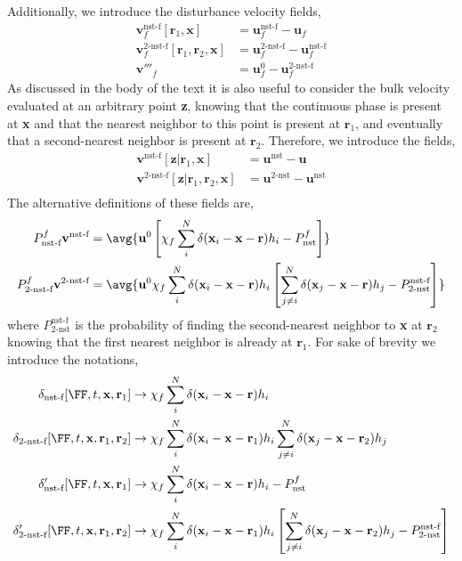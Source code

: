 Additionally, we introduce the disturbance velocity fields, 
\begin{align}
    \textbf{v}^\text{nst-f}_f[\textbf{r}_1,\textbf{x}] &= \textbf{u}^\text{nst-f}_f - \textbf{u}_f\\
    \textbf{v}^\text{2-nst-f}_f[\textbf{r}_1,\textbf{r}_2,\textbf{x}] &= \textbf{u}^\text{2-nst-f}_f - \textbf{u}_f^\text{nst-f}\\
    \textbf{v}'''_f &= \textbf{u}^0_f - \textbf{u}^\text{2-nst-f}_f
\end{align}
As discussed in the body of the text it is also useful to consider the bulk velocity evaluated at an arbitrary point \textbf{z}, knowing that the continuous phase is present at \textbf{x} and that the nearest neighbor to this point is present at $\textbf{r}_1$, and eventually that a second-nearest neighbor is present at $\textbf{r}_2$. 
Therefore, we introduce the fields, 
\begin{align}
    \textbf{v}^\text{nst-f}[\textbf{z}| \textbf{r}_1,\textbf{x}] &= \textbf{u}^\text{nst} - \textbf{u}\\
    \textbf{v}^\text{2-nst-f}[\textbf{z}| \textbf{r}_1,\textbf{r}_2,\textbf{x}] &= \textbf{u}^\text{2-nst} - \textbf{u}^\text{nst}\\
\end{align}
The alternative definitions of these fields are, 
\begin{align}
    P_\text{nst-f}^f \textbf{v}^\text{nst-f} &= \avg{ \textbf{u}^0 \left[\chi_f \sum_i^N \delta(\textbf{x}_i - \textbf{x}- \textbf{r})h_i - P_\text{nst}^f\right]}\\
    P_\text{2-nst-f}^f \textbf{v}^\text{2-nst-f} &= \avg{ \textbf{u}^0 \chi_f \sum_i^N \delta(\textbf{x}_i - \textbf{x}- \textbf{r})h_i \left[\sum_{j\neq i}^N \delta(\textbf{x}_j - \textbf{x}- \textbf{r}) h_j  - P_\text{2-nst}^\text{nst-f} \right] }
\end{align}
where $P_\text{2-nst}^\text{nst-f}$ is the probability of finding the second-nearest neighbor to \textbf{x} at $\textbf{r}_2$ knowing that the first nearest neighbor is already at $\textbf{r}_1$. 
For sake of brevity we introduce the notations, 
\begin{align}
    \delta_\text{nst-f}[\FF,t,\textbf{x},\textbf{r}_1] &\to \chi_f \sum_i^N \delta(\textbf{x}_i - \textbf{x}- \textbf{r})h_i \\
    \delta_\text{2-nst-f}[\FF,t,\textbf{x},\textbf{r}_1,\textbf{r}_2]  &\to  \chi_f \sum_i^N \delta(\textbf{x}_i - \textbf{x}- \textbf{r}_1)h_i \sum_{j\neq i}^N \delta(\textbf{x}_j - \textbf{x}- \textbf{r}_2) h_j  \\
    \delta_\text{nst-f}'[\FF,t,\textbf{x},\textbf{r}_1] &\to \chi_f \sum_i^N \delta(\textbf{x}_i - \textbf{x}- \textbf{r})h_i - P_\text{nst}^f\\
    \delta_\text{2-nst-f}'[\FF,t,\textbf{x},\textbf{r}_1,\textbf{r}_2]  &\to  \chi_f \sum_i^N \delta(\textbf{x}_i - \textbf{x}- \textbf{r}_1)h_i \left[\sum_{j\neq i}^N \delta(\textbf{x}_j - \textbf{x}- \textbf{r}_2) h_j  - P_\text{2-nst}^\text{nst-f} \right]
\end{align}
